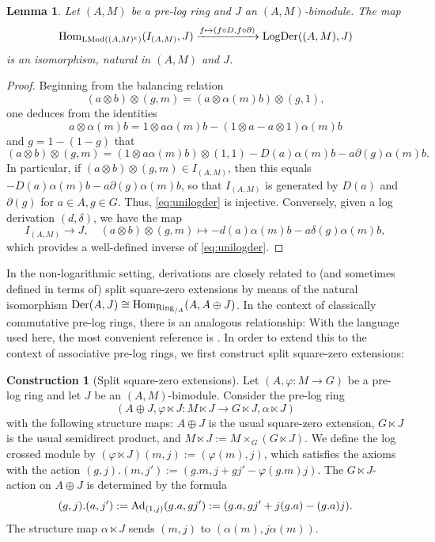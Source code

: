 \documentclass[a4paper,10pt%
]{amsart}
\numberwithin{equation}{section}
\newtheorem{lemma}[subsection]{Lemma}
\theoremstyle{definition}
\newtheorem{construction}[subsection]{Construction}
\renewcommand{\:}{\colon}
\begin{document}
\begin{lemma}\label{lem:unilogder} Let $(A, M)$ be a pre-log ring and $J$ an $(A, M)$-bimodule. The map \begin{equation}\label{eq:unilogder}{\rm Hom}_{{\rm LMod}((A, M)^e)}(I_{(A, M)}, J) \xrightarrow{f \mapsto (f \circ D, f \circ \partial)} {\rm LogDer}((A, M), J)\end{equation} is an isomorphism, natural in $(A, M)$ and $J$. 
\end{lemma}

\begin{proof} Beginning from the balancing relation \[(a \otimes b) \otimes (g, m) = (a \otimes \alpha(m)b) \otimes (g, 1),\] one deduces from the identities \[a \otimes \alpha(m)b = 1 \otimes a\alpha(m)b - (1 \otimes a - a \otimes 1)\alpha(m)b\] and $g = 1 - (1 - g)$ that \[(a \otimes b) \otimes (g, m) = (1 \otimes a \alpha(m) b) \otimes (1, 1) - D(a)\alpha(m)b - a\partial(g)\alpha(m)b.\] In particular, if $(a \otimes b) \otimes (g, m) \in I_{(A, M)}$, then this equals $-D(a)\alpha(m)b - a\partial(g)\alpha(m)b$, so that $I_{(A, M)}$ is generated by $D(a)$ and $\partial(g)$ for $a \in A, g \in G$. Thus, \eqref{eq:unilogder} is injective. Conversely, given a log derivation $(d, \delta)$, we have the map \[I_{(A, M)} \to J, \quad (a \otimes b) \otimes (g, m) \mapsto -d(a)\alpha(m)b - a\delta(g)\alpha(m)b,\] which provides a well-defined inverse of \eqref{eq:unilogder}. 
\end{proof}

In the non-logarithmic setting, derivations are closely related to (and sometimes defined in terms of) split square-zero extensions by means of the natural isomorphism ${\rm Der}(A, J) \cong {\rm Hom}_{{\rm Ring}_{/A}}(A, A \oplus J)$. In the context of classically commutative pre-log rings, there is an analogous relationship: With the language used here, the most convenient reference is \cite[Section 4]{Rog09}. In order to extend this to the context of associative pre-log rings, we first construct split square-zero extensions:

\begin{construction}[Split square-zero extensions]\label{constr:splitsqzero} Let $(A, \varphi \colon M \to G)$ be a pre-log ring and let $J$ be an $(A, M)$-bimodule. Consider the pre-log ring \[(A \oplus J, \varphi \ltimes J \colon M \ltimes J \to G \ltimes J, \alpha \ltimes J)\] with the following structure maps: $A \oplus J$ is the usual square-zero extension, $G \ltimes J$ is the usual semidirect product, and $M \ltimes J := M \times_G (G \ltimes J)$. We define the log crossed module by $(\varphi \ltimes J)(m, j) := (\varphi(m), j)$, which satisfies the axioms with the action $(g, j).(m, j') := (g.m, j + gj' - \varphi(g.m)j)$. The $G \ltimes J$-action on $A \oplus J$ is determined by the formula \[(g, j).(a, j') := {\rm Ad}_{(1, j)}(g.a, gj') := (g.a, gj' + j(g.a) - (g.a)j).\] The structure map $\alpha \ltimes J$ sends $(m, j)$ to $(\alpha(m), j\alpha(m))$.
\end{construction}
\end{document}
